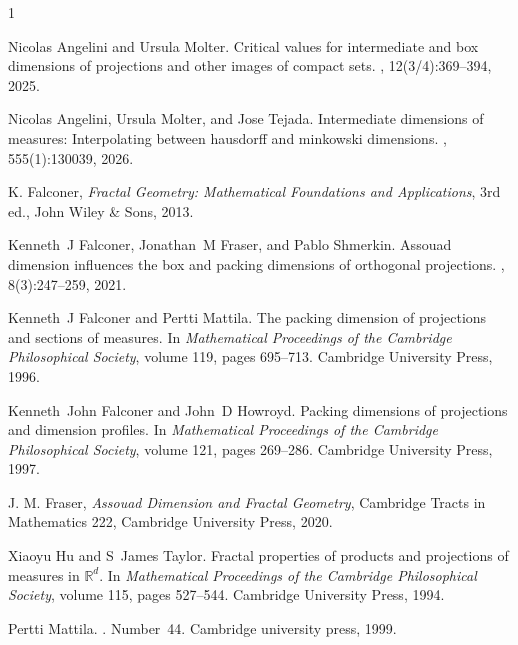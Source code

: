 \documentclass[12pt]{amsart}
\theoremstyle{definition}
\theoremstyle{remark}
\numberwithin{equation}{section}
\begin{document}
\begin{thebibliography}{1}

Nicolas Angelini and Ursula Molter.
\newblock Critical values for intermediate and box dimensions of projections and other images of compact sets.
, 12(3/4):369--394, 2025.

Nicolas Angelini, Ursula Molter, and Jose Tejada.
\newblock Intermediate dimensions of measures: Interpolating between hausdorff and minkowski dimensions.
, 555(1):130039, 2026.

K. Falconer, \emph{Fractal Geometry: Mathematical Foundations and
Applications}, 3rd ed., John Wiley \& Sons, 2013.

Kenneth~J Falconer, Jonathan~M Fraser, and Pablo Shmerkin.
\newblock Assouad dimension influences the box and packing dimensions of orthogonal projections.
, 8(3):247--259, 2021.

Kenneth~J Falconer and Pertti Mattila.
\newblock The packing dimension of projections and sections of measures.
\newblock In {\em Mathematical Proceedings of the Cambridge Philosophical Society}, volume 119, pages 695--713. Cambridge University Press, 1996.

Kenneth~John Falconer and John~D Howroyd.
\newblock Packing dimensions of projections and dimension profiles.
\newblock In {\em Mathematical Proceedings of the Cambridge Philosophical Society}, volume 121, pages 269--286. Cambridge University Press, 1997.

J. M. Fraser, \emph{Assouad Dimension and Fractal Geometry}, Cambridge
Tracts in Mathematics 222, Cambridge University Press, 2020.

Xiaoyu Hu and S~James Taylor.
\newblock Fractal properties of products and projections of measures in $\mathbb{R}^d$.
\newblock In {\em Mathematical Proceedings of the Cambridge Philosophical Society}, volume 115, pages 527--544. Cambridge University Press, 1994.


Pertti Mattila.
.
\newblock Number~44. Cambridge university press, 1999.


\end{thebibliography}
\end{document}
